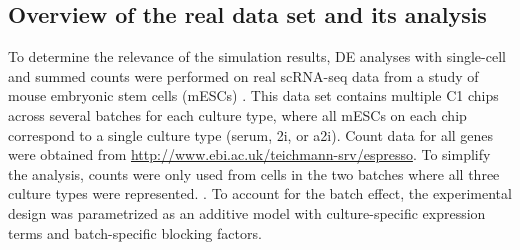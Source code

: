 \documentclass[oupdraft]{bio}
\begin{document}
\subsection{Overview of the real data set and its analysis}
To determine the relevance of the simulation results, DE analyses with single-cell and summed counts were performed on real scRNA-seq data from a study of mouse embryonic stem cells (mESCs)  \citep{kolod2015single}.
This data set contains multiple C1 chips across several batches for each culture type, where all mESCs on each chip correspond to a single culture type (serum, 2i, or a2i). 
Count data for all genes were obtained from \url{http://www.ebi.ac.uk/teichmann-srv/espresso}.
To simplify the analysis, counts were only used from cells in the two batches where all three culture types were represented.
.
To account for the batch effect, the experimental design was parametrized as an additive model with culture-specific expression terms and batch-specific blocking factors.


\end{document}
